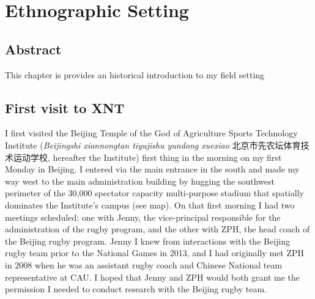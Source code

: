 \chapter{\label{ethnographicSetting}Ethnographic Setting}

\section{Abstract}

This chapter is provides an historical introduction to my field setting


\section{First visit to XNT}
I first visited the Beijing Temple of the God of Agriculture Sports Technology Institute (\textit{Beijingshi xiannongtan tiyujishu yundong xuexiao} 北京市先农坛体育技术运动学校, hereafter the Institute) first thing in the morning on my first Monday in Beijing. I entered via the main entrance in the south and made my way west to the main administration building by hugging the southwest perimeter of the 30,000 spectator capacity multi-purpose stadium that spatially dominates the Institute's campus (see map).  On that first morning I had two meetings scheduled: one with Jenny, the vice-principal responsible for the administration of the rugby program, and the other with ZPH, the head coach of the Beijing rugby program.  Jenny I knew from interactions with the Beijing rugby team prior to the National Games in 2013, and I had originally met ZPH in 2008 when he was an assistant rugby coach and Chinese National team representative at CAU.  I hoped that Jenny and ZPH would both grant me the permission I needed to conduct research with the Beijing rugby team.

